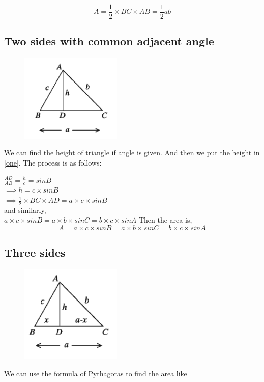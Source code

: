 \begin{equation}
	\label{e1}
	A= \frac{1}{2}\times BC \times AB = \frac{1}{2}ab
\end{equation}

\subsection{Two sides with common adjacent angle}
\begin{figure}
	\includegraphics[width=1.9in]{pics/sas}
\end{figure}
We can find the height of triangle if angle is given. And then we put the height in \autoref{one}. The process is as follows:

$\frac{AD}{AB} = \frac{h}{c} = sinB$\\
$\implies h= c\times sinB$\\
$\implies \frac{1}{2}\times BC \times AD=a\times c\times sinB$\\
and similarly,\\ $a\times c\times sinB = a\times b\times sinC = b\times c\times sinA$
Then the area is,
\begin{equation}
\label{e2}
A= a\times c\times sinB = a\times b\times sinC = b\times c\times sinA
\end{equation}


\subsection{Three sides}
\begin{figure}
	\includegraphics[width=1.9in]{pics/sss}
\end{figure}
We can use the formula of Pythagoras to find the area like\\

